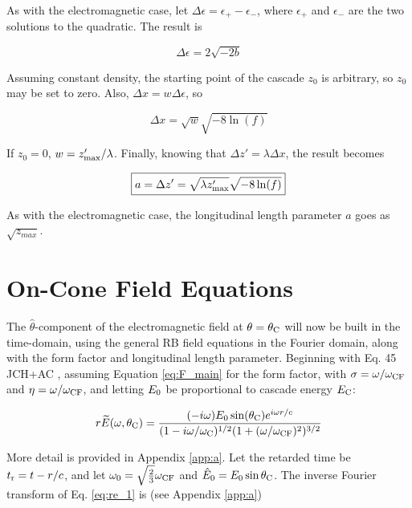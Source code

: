 \documentclass[amsmath,amssymb,aps,prd,10pt,twocolumn]{revtex4}
\begin{document}
As with the electromagnetic case, let $\Delta \epsilon = \epsilon_{+} - \epsilon_{-}$, where $\epsilon_{+}$ and $\epsilon_{-}$ are the two solutions to the quadratic.  The result is

\begin{equation}
\Delta \epsilon = 2\sqrt{-2b}
\end{equation}

Assuming constant density, the starting point of the cascade $z_0$ is arbitrary, so $z_0$ may be set to zero.  Also, $\Delta x = w\Delta \epsilon$, so

\begin{equation}
\Delta x = \sqrt{w} \sqrt{-8 \ln(f)}
\end{equation}

If $z_0 = 0$, $w = z'_{\rm max}/\lambda$.  Finally, knowing that $\Delta z' = \lambda \Delta x$, the result becomes

\begin{equation}
\boxed{
a = \Delta z' = \sqrt{\lambda z'_{\rm max}} \sqrt{-8 \ln(f)}
} \label{eq:main_2}
\end{equation}

As with the electromagnetic case, the longitudinal length parameter $a$ goes as $\sqrt{z_{max}}$.

\section{On-Cone Field Equations}
\label{sec:onc}

The $\hat{\theta}$-component of the electromagnetic field at $\theta = \theta_{\rm C}$ will now be built in the time-domain, using the general RB field equations in the Fourier domain, along with the form factor and longitudinal length parameter.  Beginning with Eq. 45 JCH+AC \cite{10.1016/j.astropartphys.2017.03.008}, assuming Equation \ref{eq:F_main} for the form factor, with $\sigma = \omega/\omega_{\rm CF}$ and $\eta = \omega/\omega_{\rm CF}$, and letting $E_{\rm 0}$ be proportional to cascade energy $E_{\rm C}$:

\begin{equation}
r\widetilde{E}(\omega,\theta_{\rm C}) = \frac{(-i\omega) E_0 \sin(\theta_{\rm C}) e^{i\omega r/c}}{(1-i \omega/\omega_{\rm C})^{1/2} (1+(\omega/\omega_{\rm CF})^2)^{3/2}} \label{eq:re_1}
\end{equation}

More detail is provided in Appendix \ref{app:a}. Let the retarded time be $t_{\rm r} = t - r/c$, and let $\omega_0 = \sqrt{\frac{2}{3	}}\omega_{\rm CF}$ and $\hat{E}_{\rm 0} = E_{\rm 0} \sin\theta_{\rm C}$.  The inverse Fourier transform of Eq. \ref{eq:re_1} is (see Appendix \ref{app:a})
\end{document}
